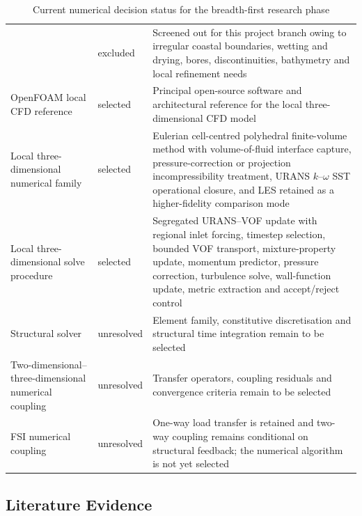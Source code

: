 \begin{table}[htbp]
\begin{tabular}{
      p{}
      p{}
      p{}
    }
    &
    excluded
    &
    Screened out for this project branch owing to irregular coastal
    boundaries, wetting and drying, bores, discontinuities, bathymetry
    and local refinement needs
    \\
    OpenFOAM local CFD reference
    &
    selected
    &
    Principal open-source software and architectural reference for the
    local three-dimensional CFD model
    \\
    Local three-dimensional numerical family
    &
    selected
    &
    Eulerian cell-centred polyhedral finite-volume method with
    volume-of-fluid interface capture, pressure-correction or projection
    incompressibility treatment, URANS $k$--$\omega$ SST operational
    closure, and LES retained as a higher-fidelity comparison mode
    \\
    Local three-dimensional solve procedure
    &
    selected
    &
    Segregated URANS--VOF update with regional inlet forcing, timestep
    selection, bounded VOF transport, mixture-property update,
    momentum predictor, pressure correction, turbulence solve,
    wall-function update, metric extraction and accept/reject control
    \\
    Structural solver
    &
    unresolved
    &
    Element family, constitutive discretisation and structural time
    integration remain to be selected
    \\
    Two-dimensional--three-dimensional numerical coupling
    &
    unresolved
    &
    Transfer operators, coupling residuals and convergence criteria
    remain to be selected
    \\
    FSI numerical coupling
    &
    unresolved
    &
    One-way load transfer is retained and two-way coupling remains
    conditional on structural feedback; the numerical algorithm is not
    yet selected
    \\
    \hline
  \end{tabular}
  \caption{Current numerical decision status for the breadth-first
  research phase}
  \label{tab:res-num-spec-numerical-decision-status}
\end{table}

\subsection{Literature Evidence}
\label{sec:res-num-spec-literature-evidence}

%


